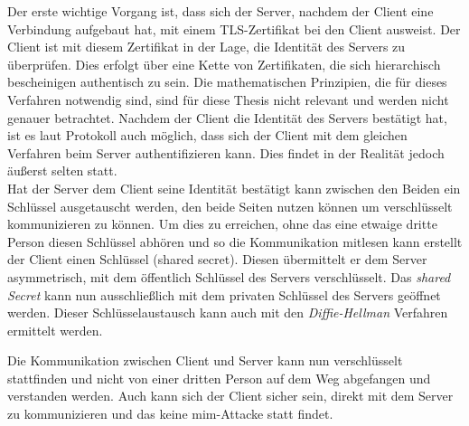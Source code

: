Der erste wichtige Vorgang ist, dass sich der Server, nachdem der Client eine Verbindung aufgebaut hat, mit einem TLS-Zertifikat bei den Client ausweist.
Der Client ist mit diesem Zertifikat in der Lage, die Identität des Servers zu überprüfen.
Dies erfolgt über eine Kette von Zertifikaten, die sich hierarchisch bescheinigen authentisch zu sein.
Die mathematischen Prinzipien, die für dieses Verfahren notwendig sind, sind für diese Thesis nicht relevant und werden nicht genauer betrachtet.
Nachdem der Client die Identität des Servers bestätigt hat, ist es laut Protokoll auch möglich, dass sich der Client mit dem gleichen Verfahren beim Server authentifizieren kann.
Dies findet in der Realität jedoch äußerst selten statt.\\

Hat der Server dem Client seine Identität bestätigt kann zwischen den Beiden ein Schlüssel ausgetauscht werden, den beide Seiten nutzen können um verschlüsselt kommunizieren zu können.
Um dies zu erreichen, ohne das eine etwaige dritte Person diesen Schlüssel abhören und so die Kommunikation mitlesen kann erstellt der Client einen Schlüssel (shared secret).
Diesen übermittelt er dem Server asymmetrisch, mit dem öffentlich Schlüssel des Servers verschlüsselt.
Das \textit{shared Secret} kann nun ausschließlich mit dem privaten Schlüssel des Servers geöffnet werden.
Dieser Schlüsselaustausch kann auch mit den \textit{Diffie-Hellman} Verfahren ermittelt werden.

Die Kommunikation zwischen Client und Server kann nun verschlüsselt stattfinden und nicht von einer dritten Person auf dem Weg abgefangen und verstanden werden.
Auch kann sich der Client sicher sein, direkt mit dem Server zu kommunizieren und das keine \ac{mim}-Attacke statt findet.

\pagebreak